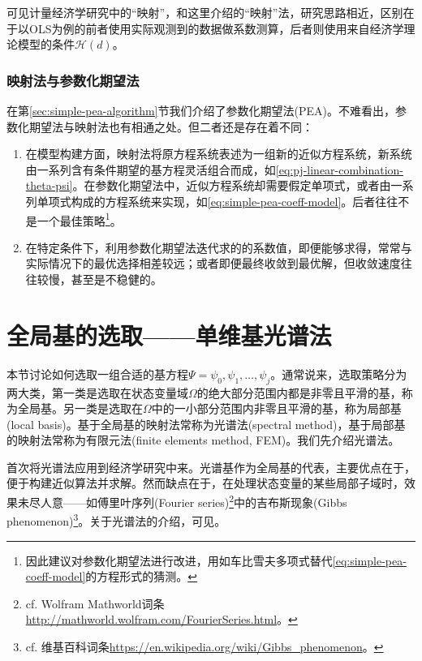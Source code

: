 可见计量经济学研究中的``映射''，和这里介绍的``映射''法，研究思路相近，区别在于以OLS为例的前者使用实际观测到的数据做系数测算，后者则使用来自经济学理论模型的条件$\mathcal{H}(d)$。

\subsubsection{映射法与参数化期望法}
在第\ref{sec:simple-pea-algorithm}节我们介绍了参数化期望法(PEA)。不难看出，参数化期望法与映射法也有相通之处。但二者还是存在着不同：
\begin{enumerate}
  \item 在模型构建方面，映射法将原方程系统表述为一组新的近似方程系统，新系统由一系列含有条件期望的基方程灵活组合而成，如\eqref{eq:pj-linear-combination-theta-psi}。在参数化期望法中，近似方程系统却需要假定单项式，或者由一系列单项式构成的方程系统来实现，如\eqref{eq:simple-pea-coeff-model}。后者往往不是一个最佳策略\footnote{\cite{Christiano:2000bw}因此建议对参数化期望法进行改进，用如车比雪夫多项式替代\eqref{eq:simple-pea-coeff-model}的方程形式的猜测。}。

  \item 在特定条件下，利用参数化期望法迭代求的的系数值，即便能够求得，常常与实际情况下的最优选择相差较远；或者即便最终收敛到最优解，但收敛速度往往较慢，甚至是不稳健的。
\end{enumerate}

\section{全局基的选取——单维基光谱法}
\label{sec:pj-spectral-method-global}

本节讨论如何选取一组合适的基方程$\Psi = \psi_0, \psi_1, \ldots, \psi_j$。通常说来，选取策略分为两大类，第一类是选取在状态变量域$\Omega$的绝大部分范围内都是非零且平滑的基，称为全局基。另一类是选取在$\Omega$中的一小部分范围内非零且平滑的基，称为局部基(local basis)。基于全局基的映射法常称为光谱法(spectral method)，基于局部基的映射法常称为有限元法(finite elements method, FEM)。我们先介绍光谱法。

\cite{Judd:1992gs}首次将光谱法应用到经济学研究中来。光谱基作为全局基的代表，主要优点在于，便于构建近似算法并求解。然而缺点在于，在处理状态变量的某些局部子域时，效果未尽人意——如傅里叶序列(Fourier series)\footnote{cf. Wolfram Mathworld词条\url{http://mathworld.wolfram.com/FourierSeries.html}。}中的吉布斯现象(Gibbs phenomenon)\footnote{cf. 维基百科词条\url{https://en.wikipedia.org/wiki/Gibbs_phenomenon}。}。关于光谱法的介绍，可见\cite{Shen:2011tf}。

